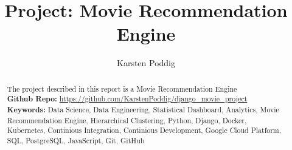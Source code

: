 \documentclass{article}
\title{Project: Movie Recommendation Engine}
\author{Karsten Poddig}
\begin{document}
\maketitle

\begin{abstract}
The project described in this report is a Movie Recommendation Engine\\

\textbf{Github Repo:} \url{https://github.com/KarstenPoddig/django_movie_project}\\

\textbf{Keywords:} Data Science, Data Engineering, Statistical Dashboard, Analytics, Movie Recommendation Engine, Hierarchical Clustering,  Python, Django, Docker, Kubernetes, Continious Integration, Continious Development, Google Cloud Platform, SQL, PostgreSQL, JavaScript, Git, GitHub


\end{abstract}
\end{document}
